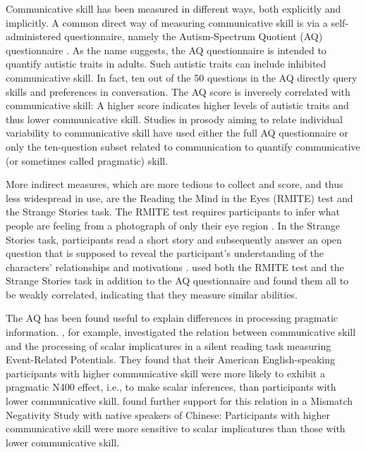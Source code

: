 Communicative skill has been measured in different ways, both explicitly and implicitly. A common direct way of measuring communicative skill is via a self-administered questionnaire, namely the Autism-Spectrum Quotient (AQ) questionnaire \citep{baron-cohenAutismSpectrumQuotientAQ2006}. As the name suggests, the AQ questionnaire is intended to quantify autistic traits in adults. Such autistic traits can include inhibited communicative skill. In fact, ten out of the 50 questions in the AQ directly query skills and preferences in conversation. The AQ score is inversely correlated with communicative skill: A higher score indicates higher levels of autistic traits and thus lower communicative skill. Studies in prosody aiming to relate individual variability to communicative skill have used either the full AQ questionnaire \citep[e.g.,][]{turnbullListenerorientedPhoneticReduction2019} or only the ten-question subset related to communication \citep[e.g.,][]{bishopFocusProjectionPrenuclear2017, bishopPhonologyPhoneticsSignalextrinsic2020} to quantify communicative (or sometimes called pragmatic) skill.

More indirect measures, which are more tedious to collect and score, and thus less widespread in use, are the Reading the Mind in the Eyes (RMITE) test and the Strange Stories task. The RMITE test requires participants to infer what people are feeling from a photograph of only their eye region \citep{baron-cohenAnotherAdvancedTest1997}. In the Strange Stories task, participants read a short story and subsequently answer an open question that is supposed to reveal the participant's understanding of the characters' relationships and motivations \citep{happeAdvancedTestTheory1994}. \citet{turnbullListenerorientedPhoneticReduction2019} used both the RMITE test and the Strange Stories task in addition to the AQ questionnaire and found them all to be weakly correlated, indicating that they measure similar abilities.

The AQ has been found useful to explain differences in processing pragmatic information. \citet{nieuwlandIncrementalityPragmaticProcessing2010}, for example, investigated the relation between communicative skill and the processing of scalar implicatures in a silent reading task measuring Event-Related Potentials. They found that their American English-speaking participants with higher communicative skill were more likely to exhibit a pragmatic N400 effect, i.e., to make scalar inferences, than participants with lower communicative skill. \citet{zhaoAreScalarImplicatures2015} found further support for this relation in a Mismatch Negativity Study with native speakers of Chinese: Participants with higher communicative skill were more sensitive to scalar implicatures than those with lower communicative skill.

